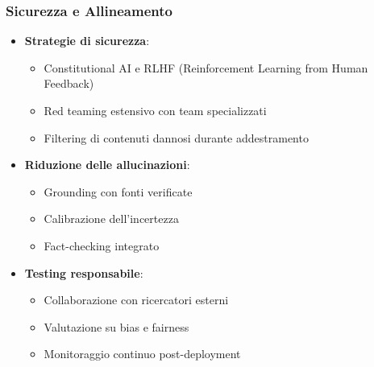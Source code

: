 \documentclass[aspectratio=169]{beamer}
\begin{document}
\begin{frame}
\frametitle{Sicurezza e Allineamento}
\begin{itemize}
    \item \textbf{Strategie di sicurezza}:
    \begin{itemize}
        \item Constitutional AI e RLHF (Reinforcement Learning from Human Feedback)
        \item Red teaming estensivo con team specializzati
        \item Filtering di contenuti dannosi durante addestramento
    \end{itemize}
    \item \textbf{Riduzione delle allucinazioni}:
    \begin{itemize}
        \item Grounding con fonti verificate
        \item Calibrazione dell'incertezza
        \item Fact-checking integrato
    \end{itemize}
    \item \textbf{Testing responsabile}:
    \begin{itemize}
        \item Collaborazione con ricercatori esterni
        \item Valutazione su bias e fairness
        \item Monitoraggio continuo post-deployment
    \end{itemize}
\end{itemize}
\end{frame}
%
%
\end{document}

